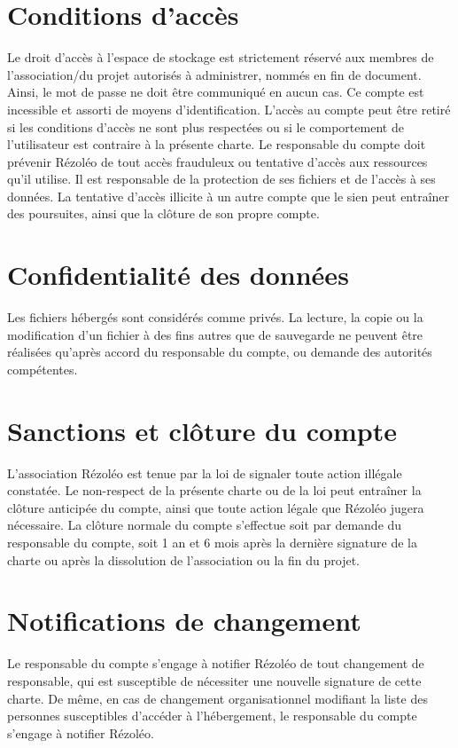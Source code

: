 \documentclass[11pt, a4paper]{article}
\begin{document}
\section{Conditions d'accès}
Le droit d'accès à l'espace de stockage est strictement réservé aux membres de l'association/du projet autorisés à administrer, nommés en fin de document. Ainsi, le mot de passe ne doit être communiqué en aucun cas. Ce compte est incessible et assorti de moyens d'identification. L'accès au compte peut être retiré si les conditions d'accès ne sont plus respectées ou si le comportement de l'utilisateur est contraire à la présente charte. Le responsable du compte doit prévenir Rézoléo de tout accès frauduleux ou tentative d'accès aux ressources qu'il utilise. Il est responsable de la protection de ses fichiers et de l'accès à ses données. La tentative d'accès illicite à un autre compte que le sien peut entraîner des poursuites, ainsi que la clôture de son propre compte.

\section{Confidentialité des données}
Les fichiers hébergés sont considérés comme privés. La lecture, la copie ou la modification d'un fichier à des fins autres que de sauvegarde ne peuvent être réalisées qu'après accord du responsable du compte, ou demande des autorités compétentes.

\section{Sanctions et clôture du compte}
L'association Rézoléo est tenue par la loi de signaler toute action illégale constatée. Le non-respect de la présente charte ou de la loi peut entraîner la clôture anticipée du compte, ainsi que toute action légale que Rézoléo jugera nécessaire.
La clôture normale du compte s'effectue soit par demande du responsable du compte, soit 1 an et 6 mois après la dernière signature de la charte ou après la dissolution de l'association ou la fin du projet.

\section{Notifications de changement}
Le responsable du compte s'engage à notifier Rézoléo de tout changement de responsable, qui est susceptible de nécessiter une nouvelle signature de cette charte. De même, en cas de changement organisationnel modifiant la liste des personnes susceptibles d'accéder à l'hébergement, le responsable du compte s'engage à notifier Rézoléo.
\end{document}

